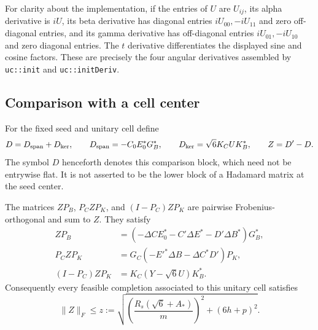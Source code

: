 For clarity about the implementation, if the entries of $U$ are $U_{ij}$,
its alpha derivative is $iU$, its beta derivative has diagonal entries
$iU_{00},-iU_{11}$ and zero off-diagonal entries, and its gamma derivative
has off-diagonal entries $iU_{01},-iU_{10}$ and zero diagonal entries.
The $t$ derivative differentiates the displayed sine and cosine factors.
These are precisely the four angular derivatives assembled by
\texttt{uc::init} and \texttt{uc::initDeriv}.

\subsection{Comparison with a cell center}

For the fixed seed and unitary cell define
\begin{equation}
\label{completion:comparison-def}
 D=D_{\rm span}+D_{\rm ker},\qquad
 D_{\rm span}=-C_0E_0^*G_B^*,\qquad
 D_{\rm ker}=\sqrt6 K_C U K_B^*,\qquad Z=D'-D.
\end{equation}
The symbol $D$ henceforth denotes this comparison block, which need not be
entrywise flat.  It is not asserted to be the lower block of a Hadamard
matrix at the seed center.

\begin{lemma}
\label{completion:comparison-pieces}
The matrices $ZP_B$, $P_CZP_K$, and $(I-P_C)ZP_K$ are pairwise
Frobenius-orthogonal and sum to $Z$.  They satisfy
\begin{align}
\label{completion:piece-B}
 ZP_B&=(-\Delta C E_0^*-C'\Delta E^*-D'\Delta B^*)G_B^*,\\
\label{completion:piece-C}
 P_CZP_K&=G_C(-E'^*\Delta B-\Delta C^*D')P_K,\\
\label{completion:piece-K}
 (I-P_C)ZP_K&=K_C(Y-\sqrt6 U)K_B^*.
\end{align}
Consequently every feasible completion associated to this unitary cell
satisfies
\begin{equation}
\label{completion:z-bound}
 \lVert Z\rVert_F\le z:=
 \sqrt{\left(\frac{R_s(\sqrt6+A_*)}{m}\right)^2+(6h+p)^2}.
\end{equation}
\end{lemma}

